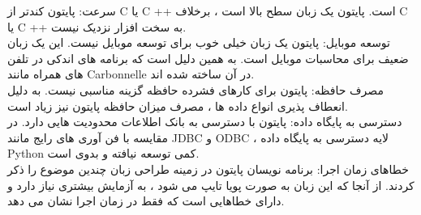 
سرعت:
پایتون کندتر از C یا C ++ است. پایتون یک زبان سطح بالا است ، برخلاف C یا C ++ به سخت افزار نزدیک نیست.\\
توسعه موبایل:
پایتون یک زبان خیلی خوب برای توسعه موبایل نیست. این یک زبان ضعیف برای محاسبات موبایل است. به همین دلیل است که برنامه های اندکی در تلفن های همراه مانند Carbonnelle در آن ساخته شده اند.\\
مصرف حافظه:
پایتون برای کارهای فشرده حافظه گزینه مناسبی نیست. به دلیل انعطاف پذیری انواع داده ها ، مصرف میزان حافظه پایتون نیز زیاد است.\\
دسترسی به پایگاه داده:
پایتون با دسترسی به بانک اطلاعات محدودیت هایی دارد. در مقایسه با فن آوری های رایج مانند JDBC و ODBC ، لایه دسترسی به پایگاه داده Python کمی توسعه نیافته و بدوی است.\\
خطاهای زمان اجرا:
برنامه نویسان پایتون در زمینه طراحی زبان چندین موضوع را ذکر کردند. از آنجا که این زبان به صورت پویا تایپ می شود ، به آزمایش بیشتری نیاز دارد و دارای خطاهایی است که فقط در زمان اجرا نشان می دهد.